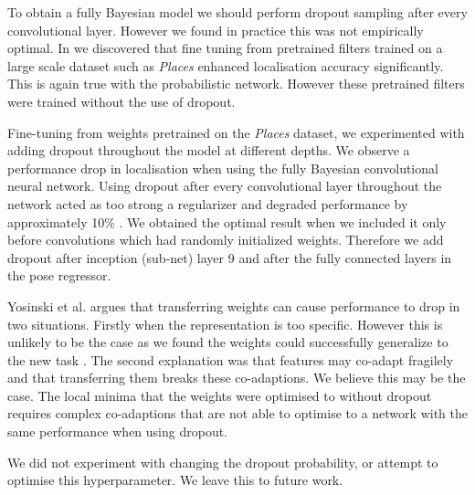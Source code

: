 To obtain a fully Bayesian model we should perform dropout sampling after every convolutional layer. However we found in practice this was not empirically optimal. In \citep{kendall2015posenet} we discovered that fine tuning from pretrained filters trained on a large scale dataset such as \textit{Places} \citep{zhou2014learning} enhanced localisation accuracy significantly. This is again true with the probabilistic network. However these pretrained filters were trained without the use of dropout.

Fine-tuning from weights pretrained on the \textit{Places} \citep{zhou2014learning} dataset, we experimented with adding dropout throughout the model at different depths.  We observe a performance drop in localisation when using the fully Bayesian convolutional neural network. Using dropout after every convolutional layer throughout the network acted as too strong a regularizer and degraded performance by approximately 10\% . We obtained the optimal result when we included it only before convolutions which had randomly initialized weights. Therefore we add dropout after inception (sub-net) layer 9 and after the fully connected layers in the pose regressor.

Yosinski et al. \citep{yosinski2014transferable} argues that transferring weights can cause performance to drop in two situations. Firstly when the representation is too specific. However this is unlikely to be the case as we found the weights could successfully generalize to the new task \citep{kendall2015posenet}. The second explanation was that features may co-adapt fragilely and that transferring them breaks these co-adaptions. We believe this may be the case. The local minima that the weights were optimised to without dropout requires complex co-adaptions that are not able to optimise to a network with the same performance when using dropout.

We did not experiment with changing the dropout probability, or attempt to optimise this hyperparameter. We leave this to future work.

